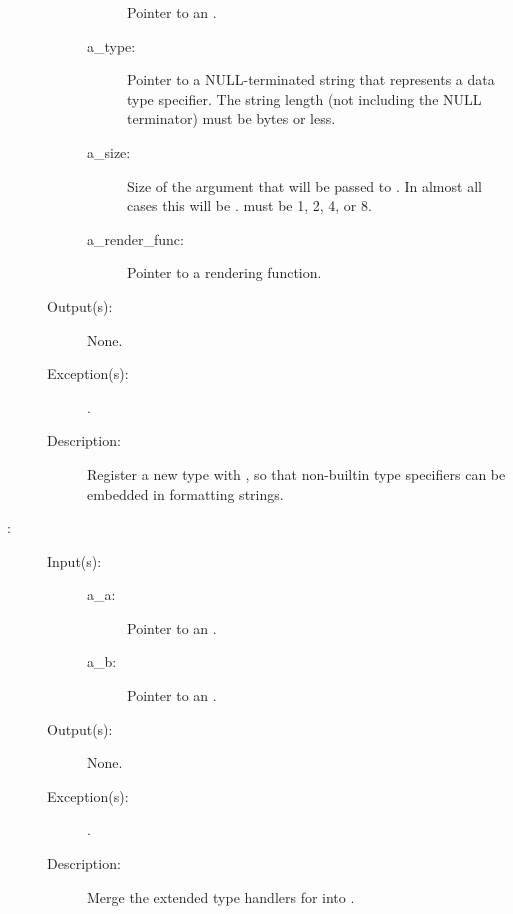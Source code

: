 \begin{description}
\begin{description}
\begin{description}
			Pointer to an .
		\item[a\_type: ]
			Pointer to a NULL-terminated string that represents a
			data type specifier.  The string length (not including
			the NULL terminator) must be
			 bytes or less.
		\item[a\_size: ]
			Size of the argument that will be passed to
			.  In almost all cases this will be
			.   must be 1, 2, 4,
			or 8.
		\item[a\_render\_func: ]
			Pointer to a rendering function.
		\end{description}
	\item[Output(s): ] None.
	\item[Exception(s): ]
		\begin{description}\item[]
		\item[.]
		\end{description}
	\item[Description: ]
		Register a new type with , so that non-builtin type
		specifiers can be embedded in formatting strings.
	\end{description}
\label{out_merge}
\item[{\cfunc[void]{out\_merge}{cw\_out\_t *a\_a, cw\_out\_t *a\_b}}: ]
	\begin{description}\item[]
	\item[Input(s): ]
		\begin{description}\item[]
		\item[a\_a: ]
			Pointer to an .
		\item[a\_b: ]
			Pointer to an .
		\end{description}
	\item[Output(s): ] None.
	\item[Exception(s): ]
		\begin{description}\item[]
		\item[.]
		\end{description}
	\item[Description: ]
		Merge the extended type handlers for  into
		.
	\end{description}
\label{out_default_fd_get}

\end{description}

